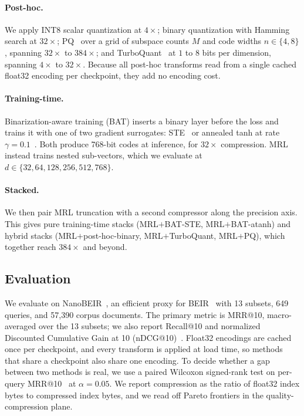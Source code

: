 \paragraph{Post-hoc.}
We apply INT8 scalar quantization at $4\times$; binary quantization with Hamming
search at $32\times$; PQ~\citep{jegou2010product} over a grid of subspace counts
$M$ and code widths $n \in \{4,8\}$, spanning $32\times$ to $384\times$; and
TurboQuant~\citep{zandieh2025turboquant} at $1$ to $8$ bits per dimension,
spanning $4\times$ to $32\times$. Because all post-hoc transforms read from a
single cached float32 encoding per checkpoint, they add no encoding cost.

\paragraph{Training-time.}
Binarization-aware training (BAT) inserts a binary layer before the loss and
trains it with one of two gradient surrogates: STE~\citep{bengio2013estimating}
or annealed tanh at rate $\gamma=0.1$~\citep{yamada2021efficient}. Both produce
768-bit codes at inference, for $32\times$ compression. MRL~\citep{kusupati2022matryoshka}
instead trains nested sub-vectors, which we evaluate at
$d \in \{32,64,128,256,512,768\}$.

\paragraph{Stacked.}
We then pair MRL truncation with a second compressor along the precision axis.
This gives pure training-time stacks (MRL$+$BAT-STE, MRL$+$BAT-atanh) and hybrid
stacks (MRL$+$post-hoc-binary, MRL$+$TurboQuant, MRL$+$PQ), which together reach
$384\times$ and beyond.

\subsection{Evaluation}
\label{subsec:eval}
We evaluate on NanoBEIR~\citep{nanobeir2024}, an efficient proxy for
BEIR~\citep{thakur2021beir} with 13 subsets, 649 queries, and 57{,}390 corpus
documents. The primary metric is MRR@10, macro-averaged over the 13 subsets; we
also report Recall@10 and normalized Discounted Cumulative Gain at 10
(nDCG@10)~\citep{jarvelin2002cumulated}. Float32 encodings are cached once per
checkpoint, and every transform is applied at load time, so methods that share a
checkpoint also share one encoding. To decide whether a gap between two methods
is real, we use a paired Wilcoxon signed-rank test on per-query
MRR@10~\citep{wilcoxon1945individual} at $\alpha=0.05$. We report compression as
the ratio of float32 index bytes to compressed index bytes, and we read off
Pareto frontiers in the quality-compression plane.

